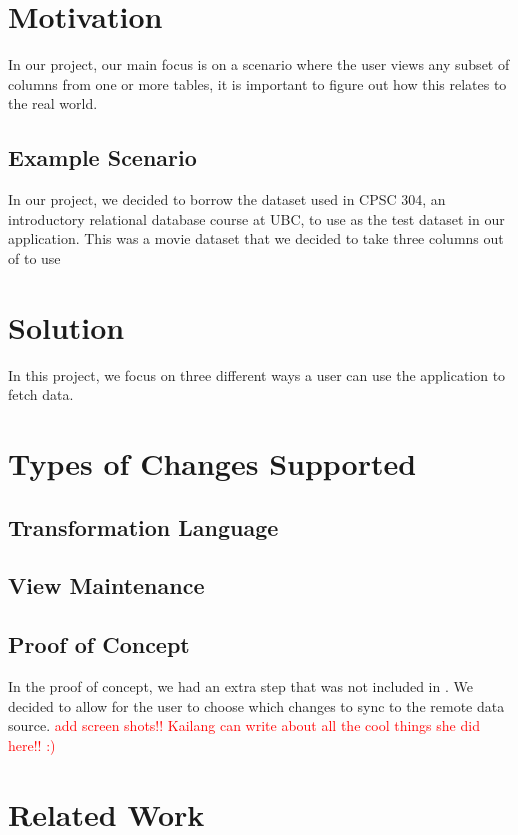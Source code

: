 \documentclass[12pt]{article}
\begin{document}
\section{Motivation}
In our project, our main focus is on a scenario where the user views any subset of columns from one or more tables, it is important to figure out how this relates to the real world.

\subsection{Example Scenario}
In our project, we decided to borrow the dataset used in CPSC 304, an introductory relational database course at UBC, to use as the test dataset in our application. This was a movie dataset that we decided to take three columns out of to use

\section{Solution}
In this project, we focus on three different ways a user can use the application to fetch data.

\noindent

\section{Types of Changes Supported}
\subsection{Transformation Language}
\subsection{View Maintenance}
\subsection{Proof of Concept}
In the proof of concept, we had an extra step that was not included in \cite{arniThesis}. We decided to allow for the user to choose which changes to sync to the remote data source. \textcolor{red}{add screen shots!! Kailang can write about all the cool things she did here!! :)}



\section{Related Work}
\end{document}
